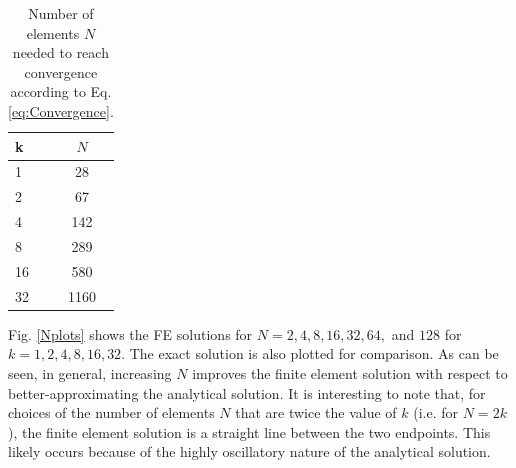 \documentclass[10pt]{article}
\begin{document}
\begin{table}[H]
\caption{Number of elements \(N\) needed to reach convergence according to Eq. \eqref{eq:Convergence}.}
\centering
\begin{tabular}{l c}
\hline\hline
k & \(N\)\\ [0.5ex]
\hline
1 & 28\\
2 & 67\\
4 & 142\\
8 & 289\\
16 & 580\\
32 & 1160\\
\hline
\end{tabular}
\label{table:N}
\end{table}

Fig. \ref{Nplots} shows the FE solutions for \(N=2, 4, 8, 16, 32, 64, \) and \(128\) for \(k=1, 2, 4, 8, 16, 32\). The exact solution is also plotted for comparison. As can be seen, in general, increasing \(N\) improves the finite element solution with respect to better-approximating the analytical solution. It is interesting to note that, for choices of the number of elements \(N\) that are twice the value of \(k\) (i.e. for \(N=2k\)), the finite element solution is a straight line between the two endpoints. This likely occurs because of the highly oscillatory nature of the analytical solution.
\end{document}
